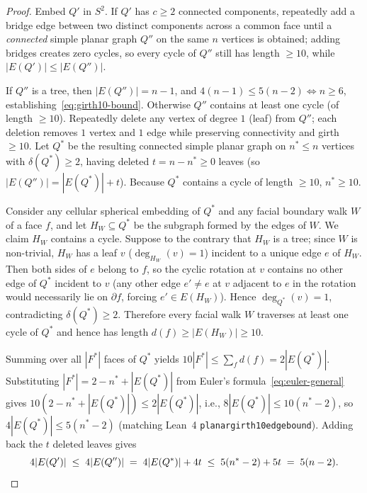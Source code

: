 \documentclass[11pt,reqno]{amsart}
\theoremstyle{plain}
\theoremstyle{definition}
\theoremstyle{remark}
\DeclareRobustCommand{\_}{\ifmmode\text{\textunderscore}\else\textunderscore\allowbreak\fi}
\begin{document}
\begin{proof}
Embed $Q'$ in $S^2$. If $Q'$ has $c \ge 2$ connected components, repeatedly add a bridge edge between two distinct components across a common face until a \emph{connected} simple planar graph $Q''$ on the same $n$ vertices is obtained; adding bridges creates zero cycles, so every cycle of $Q''$ still has length $\ge 10$, while $|E(Q')| \le |E(Q'')|$.

If $Q''$ is a tree, then $|E(Q'')| = n - 1$, and $4(n - 1) \le 5(n - 2) \iff n \ge 6$, establishing~\eqref{eq:girth10-bound}. Otherwise $Q''$ contains at least one cycle (of length $\ge 10$). Repeatedly delete any vertex of degree $1$ (leaf) from $Q''$; each deletion removes $1$ vertex and $1$ edge while preserving connectivity and girth $\ge 10$. Let $Q^*$ be the resulting connected simple planar graph on $n^* \le n$ vertices with $\delta(Q^*) \ge 2$, having deleted $t = n - n^* \ge 0$ leaves (so $|E(Q'')| = |E(Q^*)| + t$). Because $Q^*$ contains a cycle of length $\ge 10$, $n^* \ge 10$.

Consider any cellular spherical embedding of $Q^*$ and any facial boundary walk $W$ of a face $f$, and let $H_W \subseteq Q^*$ be the subgraph formed by the edges of $W$. We claim $H_W$ contains a cycle. Suppose to the contrary that $H_W$ is a tree; since $W$ is non-trivial, $H_W$ has a leaf $v$ ($\deg_{H_W}(v) = 1$) incident to a unique edge $e$ of $H_W$. Then both sides of $e$ belong to $f$, so the cyclic rotation at $v$ contains no other edge of $Q^*$ incident to $v$ (any other edge $e' \neq e$ at $v$ adjacent to $e$ in the rotation would necessarily lie on $\partial f$, forcing $e' \in E(H_W)$). Hence $\deg_{Q^*}(v) = 1$, contradicting $\delta(Q^*) \ge 2$. Therefore every facial walk $W$ traverses at least one cycle of $Q^*$ and hence has length $d(f) \ge |E(H_W)| \ge 10$.

Summing over all $|F^*|$ faces of $Q^*$ yields $10 |F^*| \le \sum_{f} d(f) = 2 |E(Q^*)|$. Substituting $|F^*| = 2 - n^* + |E(Q^*)|$ from Euler's formula~\eqref{eq:euler-general} gives $10(2 - n^* + |E(Q^*)|) \le 2|E(Q^*)|$, i.e., $8 |E(Q^*)| \le 10(n^* - 2)$, so $4 |E(Q^*)| \le 5(n^* - 2)$ (matching Lean~4 \texttt{planar\_girth10\_edge\_bound}). Adding back the $t$ deleted leaves gives
\[
  4 |E(Q')| \;\le\; 4 |E(Q'')| \;=\; 4 |E(Q^*)| + 4 t \;\le\; 5(n^* - 2) + 5 t \;=\; 5(n - 2). \qedhere
\]
\end{proof}
\end{document}
